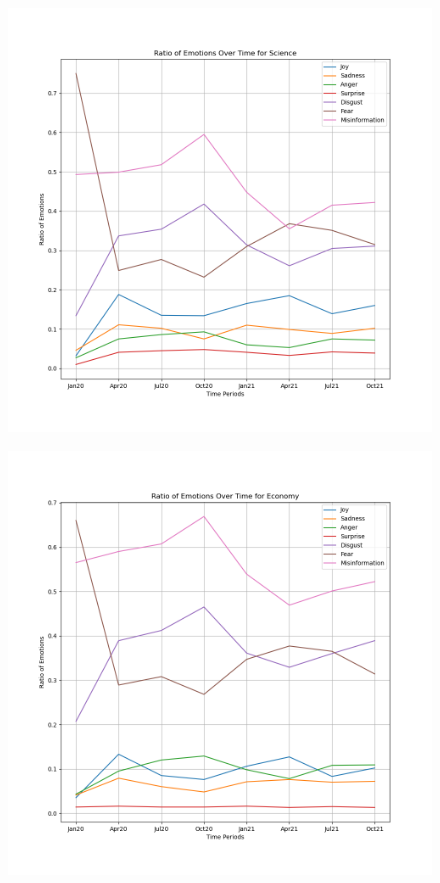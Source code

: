 \documentclass{l4proj}
\begin{document}
\begin{appendices}
\begin{figure}[H]
\begin{minipage}[c]{0.49\linewidth}
\centering
\includegraphics[width=\textwidth]{images/ScienceEmotion.png}
\label{fig:sciemo}
\end{minipage}\hfill
\begin{minipage}[c]{0.49\linewidth}
\centering
\includegraphics[width=\textwidth]{images/EconomyEmotion.png}
\label{fig:ecoemo}
\end{minipage}
\end{figure}


\end{appendices}
\end{document}
